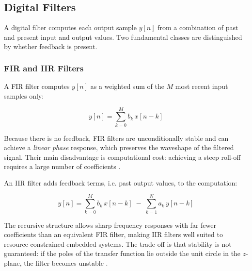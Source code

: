 \subsection{Digital Filters}
\label{sec:digital-filters}

A digital filter computes each output sample $y[n]$ from a combination of past and present input and output values.
Two fundamental classes are distinguished by whether feedback is present.

\subsubsection{FIR and IIR Filters}

A \ac{FIR} filter computes $y[n]$ as a weighted sum of the $M$ most recent input samples only:

\begin{equation}
y[n] = \sum_{k=0}^{M} b_k \, x[n-k]
\end{equation}

Because there is no feedback, FIR filters are unconditionally stable and can achieve a \textit{linear phase} response, which preserves the waveshape of the filtered signal.
Their main disadvantage is computational cost: achieving a steep roll-off requires a large number of coefficients \cite[p.~293]{oppenheimDiscretetimeSignalProcessing2014}.

An \ac{IIR} filter adds feedback terms, i.e. past output values, to the computation:

\begin{equation}
y[n] = \sum_{k=0}^{M} b_k \, x[n-k] \;-\; \sum_{k=1}^{N} a_k \, y[n-k]
\end{equation}

The recursive structure allows sharp frequency responses with far fewer coefficients than an equivalent FIR filter, making IIR filters well suited to resource-constrained embedded systems.
The trade-off is that stability is not guaranteed: if the poles of the transfer function lie outside the unit circle in the $z$-plane, the filter becomes unstable \cite[p.~371]{oppenheimDiscretetimeSignalProcessing2014}.
